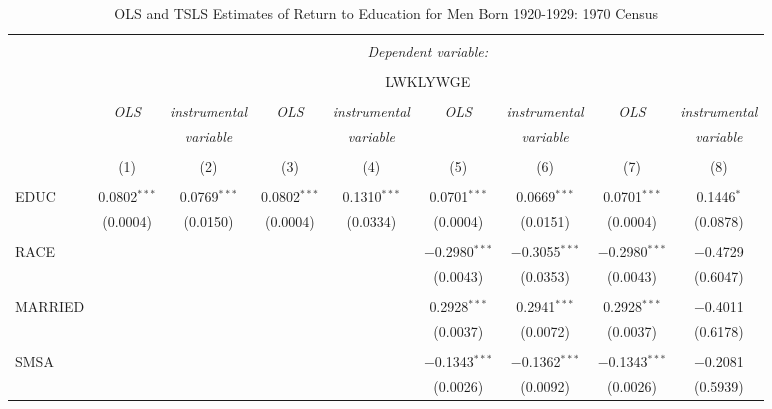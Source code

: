
\begin{table}[!htbp] \centering 
  \caption{OLS and TSLS Estimates of Return to Education for Men Born 
    1920-1929: 1970 Census} 
  \label{} 
\begin{tabular}{@{\extracolsep{5pt}}lcccccccc} 
\\[-1.8ex]\hline 
\hline \\[-1.8ex] 
 & \multicolumn{8}{c}{\textit{Dependent variable:}} \\ 
\cline{2-9} 
\\[-1.8ex] & \multicolumn{8}{c}{LWKLYWGE} \\ 
\\[-1.8ex] & \textit{OLS} & \textit{instrumental} & \textit{OLS} & \textit{instrumental} & \textit{OLS} & \textit{instrumental} & \textit{OLS} & \textit{instrumental} \\ 
 & \textit{} & \textit{variable} & \textit{} & \textit{variable} & \textit{} & \textit{variable} & \textit{} & \textit{variable} \\ 
\\[-1.8ex] & (1) & (2) & (3) & (4) & (5) & (6) & (7) & (8)\\ 
\hline \\[-1.8ex] 
 EDUC & 0.0802$^{***}$ & 0.0769$^{***}$ & 0.0802$^{***}$ & 0.1310$^{***}$ & 0.0701$^{***}$ & 0.0669$^{***}$ & 0.0701$^{***}$ & 0.1446$^{*}$ \\ 
  & (0.0004) & (0.0150) & (0.0004) & (0.0334) & (0.0004) & (0.0151) & (0.0004) & (0.0878) \\ 
  & & & & & & & & \\ 
 RACE &  &  &  &  & $-$0.2980$^{***}$ & $-$0.3055$^{***}$ & $-$0.2980$^{***}$ & $-$0.4729 \\ 
  &  &  &  &  & (0.0043) & (0.0353) & (0.0043) & (0.6047) \\ 
  & & & & & & & & \\ 
 MARRIED &  &  &  &  & 0.2928$^{***}$ & 0.2941$^{***}$ & 0.2928$^{***}$ & $-$0.4011 \\ 
  &  &  &  &  & (0.0037) & (0.0072) & (0.0037) & (0.6178) \\ 
  & & & & & & & & \\ 
 SMSA &  &  &  &  & $-$0.1343$^{***}$ & $-$0.1362$^{***}$ & $-$0.1343$^{***}$ & $-$0.2081 \\ 
  &  &  &  &  & (0.0026) & (0.0092) & (0.0026) & (0.5939) \\ 

\end{tabular}
\end{table}
